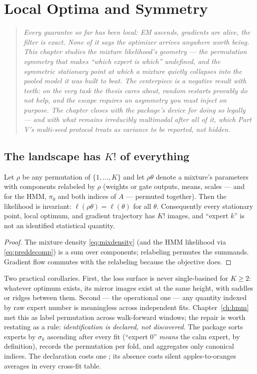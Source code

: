 \chapter{Local Optima and Symmetry}\label{ch:symmetry}

\begin{quote}\itshape
Every guarantee so far has been local: EM ascends, gradients are alive,
the filter is exact. None of it says the optimizer arrives anywhere
worth being. This chapter studies the mixture likelihood's geometry ---
the permutation symmetry that makes ``which expert is which'' undefined,
and the symmetric stationary point at which a mixture quietly collapses
into the pooled model it was built to beat. The centerpiece is a
negative result with teeth: on the very task the thesis cares about,
random restarts provably do not help, and the escape requires an
asymmetry you must inject on purpose. The chapter closes with the
package's device for doing so legally --- and with what remains
irreducibly multimodal after all of it, which Part V's multi-seed
protocol treats as variance to be reported, not hidden.
\end{quote}

\section{The landscape has $K!$ of everything}\label{sec:permsym}

\begin{proposition}\label{prop:perm}
Let $\rho$ be any permutation of $\{1,\dots,K\}$ and let $\rho\theta$
denote a mixture's parameters with components relabeled by $\rho$
(weights or gate outputs, means, scales --- and for the HMM, $\pi_0$ and
both indices of $A$ --- permuted together). Then the likelihood is
invariant: $\ell(\rho\theta) = \ell(\theta)$ for all $\theta$.
Consequently every stationary point, local optimum, and gradient
trajectory has $K!$ images, and ``expert $k$'' is not an identified
statistical quantity.
\end{proposition}

\begin{proof}
The mixture density \eqref{eq:mixdensity} (and the HMM likelihood via
\eqref{eq:preddecomp}) is a sum over components; relabeling permutes the
summands. Gradient flow commutes with the relabeling because the
objective does.
\end{proof}

Two practical corollaries. First, the loss surface is never
single-basined for $K \ge 2$: whatever optimum exists, its mirror images
exist at the same height, with saddles or ridges between them. Second
--- the operational one --- any quantity indexed by raw expert number is
meaningless across independent fits. Chapter~\ref{ch:hmm} met this as
label permutation across walk-forward windows; the repair is worth
restating as a rule: \emph{identification is declared, not discovered.}
The package sorts experts by $\sigma_k$ ascending after every fit
(``expert 0'' \emph{means} the calm expert, by definition), records the
permutation per fold, and aggregates only canonical indices. The
declaration costs one ; its absence costs silent
apples-to-oranges averages in every cross-fit table.

